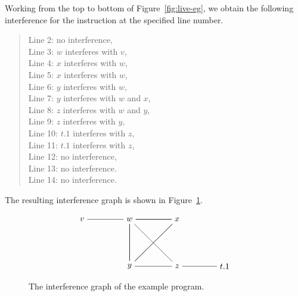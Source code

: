 \documentclass[11pt]{book}
\begin{document}
Working from the top to bottom of Figure~\ref{fig:live-eg}, we obtain
the following interference for the instruction at the specified line
number.
\begin{quote}
Line 2: no interference,\\
Line 3: $w$ interferes with $v$,\\
Line 4: $x$ interferes with $w$,\\
Line 5: $x$ interferes with $w$,\\
Line 6: $y$ interferes with $w$,\\
Line 7: $y$ interferes with $w$ and $x$,\\
Line 8: $z$ interferes with $w$ and $y$,\\
Line 9: $z$ interferes with $y$, \\
Line 10: $t.1$ interferes with $z$, \\
Line 11: $t.1$ interferes with $z$, \\
Line 12: no interference, \\
Line 13: no interference. \\
Line 14: no interference.
\end{quote}
The resulting interference graph is shown in
Figure~\ref{fig:interfere}.

\begin{figure}[tbp]
\large
\[
\begin{tikzpicture}[baseline=(current  bounding  box.center)]
\node (v) at (0,0)   {$v$};
\node (w) at (2,0)   {$w$};
\node (x) at (4,0)   {$x$};
\node (t1) at (6,-2)   {$t.1$};
\node (y) at (2,-2)  {$y$};
\node (z) at (4,-2)  {$z$};

\draw (v) to (w);
\foreach \i in {w,x,y}
{
  \foreach \j in {w,x,y}
  {
    \draw (\i) to (\j);
  }
}
\draw (z) to (w);
\draw (z) to (y);
\draw (t1) to (z);
\end{tikzpicture}
\]
\caption{The interference graph of the example program.}
\label{fig:interfere}
\end{figure}
\end{document}
